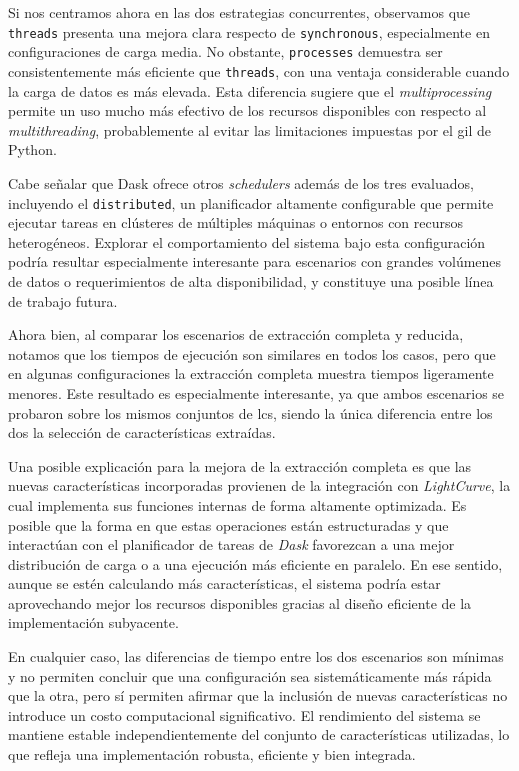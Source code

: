 Si nos centramos ahora en las dos estrategias concurrentes, observamos que \texttt{threads} presenta una mejora clara respecto de \texttt{synchronous}, especialmente en configuraciones de carga media. No obstante, \texttt{processes} demuestra ser consistentemente más eficiente que \texttt{threads}, con una ventaja considerable cuando la carga de datos es más elevada. Esta diferencia sugiere que el \emph{multiprocessing} permite un uso mucho más efectivo de los recursos disponibles con respecto al \emph{multithreading}, probablemente al evitar las limitaciones impuestas por el \gls{gil} de Python.

Cabe señalar que Dask ofrece otros \emph{schedulers} además de los tres evaluados, incluyendo el \texttt{distributed}, un planificador altamente configurable que permite ejecutar tareas en clústeres de múltiples máquinas o entornos con recursos heterogéneos. Explorar el comportamiento del sistema bajo esta configuración podría resultar especialmente interesante para escenarios con grandes volúmenes de datos o requerimientos de alta disponibilidad, y constituye una posible línea de trabajo futura.

Ahora bien, al comparar los escenarios de extracción completa y reducida, notamos que los tiempos de ejecución son similares en todos los casos, pero que en algunas configuraciones la extracción completa muestra tiempos ligeramente menores. Este resultado es especialmente interesante, ya que ambos escenarios se probaron sobre los mismos conjuntos de \glspl{lc}, siendo la única diferencia entre los dos la selección de características extraídas.

Una posible explicación para la mejora de la extracción completa es que las nuevas características incorporadas provienen de la integración con \textit{LightCurve}, la cual implementa sus funciones internas de forma altamente optimizada. Es posible que la forma en que estas operaciones están estructuradas y que interactúan con el planificador de tareas de \emph{Dask} favorezcan a una mejor distribución de carga o a una ejecución más eficiente en paralelo. En ese sentido, aunque se estén calculando más características, el sistema podría estar aprovechando mejor los recursos disponibles gracias al diseño eficiente de la implementación subyacente.

En cualquier caso, las diferencias de tiempo entre los dos escenarios son mínimas y no permiten concluir que una configuración sea sistemáticamente más rápida que la otra, pero sí permiten afirmar que la inclusión de nuevas características no introduce un costo computacional significativo. El rendimiento del sistema se mantiene estable independientemente del conjunto de características utilizadas, lo que refleja una implementación robusta, eficiente y bien integrada.

